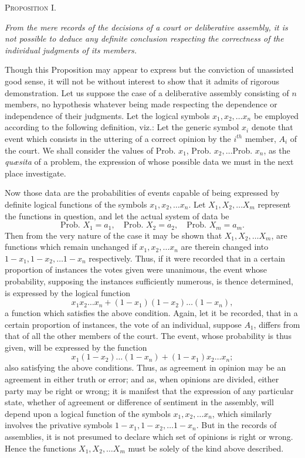 \documentclass[oneside]{book}
\begin{document}
\begin{center}\textsc{Proposition I.}\end{center}

\emph{From the mere records of the decisions of a court or deliberative
assembly, it is not possible to deduce any definite conclusion respecting the correctness of the individual judgments of its members.}

Though this Proposition may appear to express but the conviction of unassisted good sense, it will not be without interest to
show that it admits of rigorous demonstration.
Let us suppose the case of a deliberative assembly consisting
of $n$ members, no hypothesis whatever being made respecting
the dependence or independence of their judgments. Let the
logical symbols $x_1, x_2, \dotsc x_n$ be employed according to the following definition, viz.: Let the generic symbol $x_i$ denote that
event which consists in the uttering of a correct opinion by the
$i^{th}$ member, $A_i$ of the court. We shall consider the values of
Prob. $x_1$, Prob. $x_2,\dotsc $Prob. $x_n$, as the \textit{qu{\ae}sita} of a problem, the
expression of whose possible data we must in the next place
investigate.

Now those data are the probabilities of events capable of
being expressed by definite logical functions of the symbols
$x_1, x_2,\dotsc x_n$. Let $X_1, X_2, \dotsc X_m$ represent the functions in question,
and let the actual system of data be
\[
  \text{Prob. }X_1 = a_1,\quad
  \text{Prob. }X_2 = a_2,\quad
  \text{Prob. }X_m = a_m.
\]
Then from the very nature of the case it may be shown that
$X_1, X_2, \dotsc X_m$, are functions which remain unchanged if
$x_1, x_2, \dotsc x_n$ are therein changed into
$1-x_1, 1-x_2, \dotsc 1-x_n$
respectively. Thus, if it were recorded that in a certain proportion of instances the votes given were unanimous, the event
whose probability, supposing the instances sufficiently numerous,
is thence determined, is expressed by the logical function
\[
  x_1 x_2 \dotsc x_n + (1-x_1)(1-x_2)\dotsc (1-x_n),
\]
a function which satisfies the above condition. Again, let it be
recorded, that in a certain proportion of instances, the vote of an
individual, suppose $A_1$, differs from that of all the other members of the court. The event, whose probability is thus given,
will be expressed by the function
\[
  x_1(1-x_2)\dotsc (1-x_n) + (1-x_1)x_2\dotsc x_n;
\]
also satisfying the above conditions. Thus, as agreement in
opinion may be an agreement in either truth or error; and as,
when opinions are divided, either party may be right or wrong;
it is manifest that the expression of any particular state, whether
of agreement or difference of sentiment in the assembly, will
depend upon a logical function of the symbols $x_1, x_2, \dotsc x_n$,
which similarly involves the privative symbols
$1-x_1, 1-x_2, \dotsc 1-x_n$. But in the records of assemblies, it is not presumed
to declare which set of opinions is right or wrong. Hence the
functions $X_1, X_2, \dotsc X_m$ must be solely of the kind above described.
\end{document}
